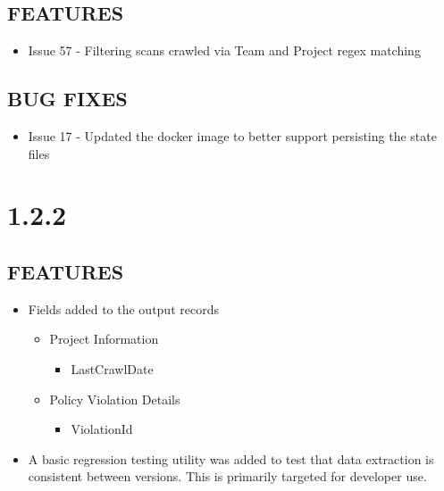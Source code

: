 \subsection*{FEATURES}
    \begin{itemize}
        \item Issue 57 - Filtering scans crawled via Team and Project regex matching
    \end{itemize}
\subsection*{BUG FIXES}
    \begin{itemize}
        \item Issue 17 - Updated the docker image to better support persisting the state files
    \end{itemize}


\section{1.2.2}
\subsection*{FEATURES}
    \begin{itemize}
        \item Fields added to the output records
        \begin{itemize}
            \item Project Information
            \begin{itemize}
                \item LastCrawlDate
            \end{itemize}
        \end{itemize}
        \begin{itemize}
            \item Policy Violation Details
            \begin{itemize}
                \item ViolationId
            \end{itemize}
        \end{itemize}
        \item A basic regression testing utility was added to test that data extraction is consistent between versions.  This is primarily targeted for developer use.
    \end{itemize}

